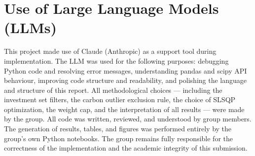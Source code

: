\documentclass[12pt, a4paper]{article}
\begin{document}
\section{Use of Large Language Models (LLMs)}

This project made use of Claude (Anthropic) as a support tool during 
implementation. The LLM was used for the following purposes: debugging Python 
code and resolving error messages, understanding pandas and scipy API behaviour, 
improving code structure and readability, and polishing the language and 
structure of this report. All methodological choices --- including the 
investment set filters, the carbon outlier exclusion rule, the choice of SLSQP 
optimization, the weight cap, and the interpretation of all results --- were 
made by the group. All code was written, reviewed, and understood by group 
members. The generation of results, tables, and figures was performed entirely 
by the group's own Python notebooks. The group remains fully responsible for 
the correctness of the implementation and the academic integrity of this 
submission.
\end{document}
